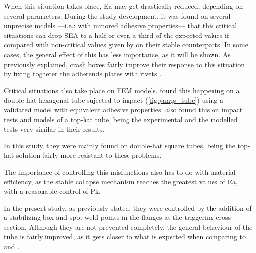 \documentclass[
documentsize = a4, %
font = cmr, %
typesize = 11, %
printmode = true,
onehalfspacing = true,
language = en, %
titlepage = udciccp, %
degree = pt, %
dedication = true,
acknowledgements = true,
abstract-en = true,
abstract-es = false,
abstract-ga = false,
epigraphs = true,
toc = true,
lof = true,
lot = true,
frontmatterintoc = false,
notation = false,
minimal = false,
]{UDCthesis}
\begin{document}
When this situation takes place, \gls{Ea} may get drastically reduced, depending on several parameters. During the study development, it was found on several unprecise models ---i.e.: with minored adhesive properties--- that this critical situations can drop \gls{SEA} to a half or even a third of the expected values if compared with non-critical values given by \citet{Peroni2009} on their stable counterparts. In some cases, the general effect of this has less importance, as it will be shown. As previously explained, crash boxes fairly improve their response to this situation by fixing togheter the adherends plates with rivets \citep{Peroni2009}.

Critical situations also take place on \gls{FEM} models. \citet{Yang2012} found this happening on a double-hat hexagonal tube sujected to impact (\cref{fig:yangs_tube}) using a validated model with equivalent adhesive properties. \citet{Yamashita2013} also found this on impact tests and models of a top-hat tube, being the experimental and the modelled tests very similar in their results.

In this study, they were mainly found on double-hat square tubes, being the top-hat solution fairly more resistant to these problems.

The importance of controlling this misfunctions also has to do with material efficiency, as the stable collapse mechanism reaches the greatest values of \gls{Ea}, with a reasonable control of \gls{Pk}.

In the present study, as previously stated, they were controlled by the addition of a stabilizing box and spot weld points in the flanges at the triggering cross section. Although they are not prevented completely, the general behaviour of the tube is fairly improved, as it gets closer to what is expected when comparing to \citet{Peroni2009} and \citet{Scattina2011}.
\end{document}
